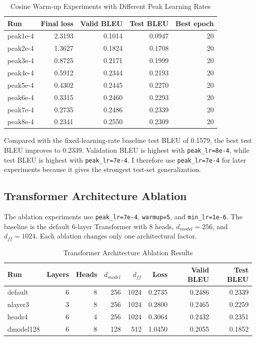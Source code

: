 \documentclass[a4paper,12pt]{article}
\begin{document}
\begin{table}[H]
\centering
\caption{Cosine Warm-up Experiments with Different Peak Learning Rates}
\label{tab:cosine-en}
\begin{tabular}{lrrrr}
\toprule
Run & Final loss & Valid BLEU & Test BLEU & Best epoch \\
\midrule
peak1e-4 & 2.3193 & 0.1014 & 0.0947 & 20 \\
peak2e-4 & 1.3627 & 0.1824 & 0.1708 & 20 \\
peak3e-4 & 0.8725 & 0.2171 & 0.1999 & 20 \\
peak4e-4 & 0.5912 & 0.2344 & 0.2193 & 20 \\
peak5e-4 & 0.4302 & 0.2445 & 0.2270 & 20 \\
peak6e-4 & 0.3315 & 0.2460 & 0.2293 & 20 \\
peak7e-4 & 0.2735 & 0.2486 & 0.2339 & 20 \\
peak8e-4 & 0.2341 & 0.2550 & 0.2309 & 20 \\
\bottomrule
\end{tabular}
\end{table}

Compared with the fixed-learning-rate baseline test BLEU of 0.1579, the best test BLEU improves to 0.2339. Validation BLEU is highest with \texttt{peak\_lr=8e-4}, while test BLEU is highest with \texttt{peak\_lr=7e-4}. I therefore use \texttt{peak\_lr=7e-4} for later experiments because it gives the strongest test-set generalization.

\subsection{Transformer Architecture Ablation}

The ablation experiments use \texttt{peak\_lr=7e-4}, \texttt{warmup=5}, and \texttt{min\_lr=1e-6}. The baseline is the default 6-layer Transformer with 8 heads, $d_{model}=256$, and $d_{ff}=1024$. Each ablation changes only one architectural factor.

\begin{table}[H]
\centering
\caption{Transformer Architecture Ablation Results}
\label{tab:ablation-en}
\begin{tabular}{lrrrrrrr}
\toprule
Run & Layers & Heads & $d_{model}$ & $d_{ff}$ & Loss & Valid BLEU & Test BLEU \\
\midrule
default & 6 & 8 & 256 & 1024 & 0.2735 & 0.2486 & 0.2339 \\
nlayer3 & 3 & 8 & 256 & 1024 & 0.2800 & 0.2465 & 0.2259 \\
heads4 & 6 & 4 & 256 & 1024 & 0.3064 & 0.2432 & 0.2351 \\
dmodel128 & 6 & 8 & 128 & 512 & 1.0450 & 0.2055 & 0.1852 \\
\bottomrule
\end{tabular}
\end{table}
\end{document}
